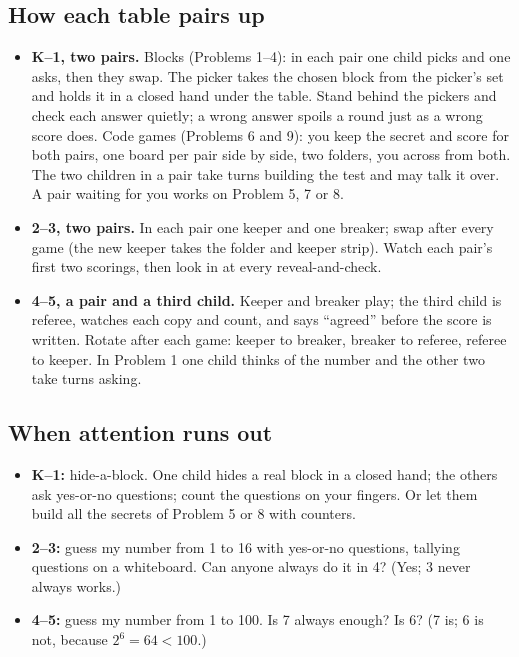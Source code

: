\documentclass[11pt]{article}
\begin{document}
\subsection{How each table pairs up}
\begin{itemize}
\item \textbf{K--1, two pairs.} Blocks (Problems 1--4): in each pair one child picks and one asks, then they swap. The picker takes the chosen block from the picker's set and holds it in a closed hand under the table. Stand behind the pickers and check each answer quietly; a wrong answer spoils a round just as a wrong score does. Code games (Problems 6 and 9): you keep the secret and score for both pairs, one board per pair side by side, two folders, you across from both. The two children in a pair take turns building the test and may talk it over. A pair waiting for you works on Problem 5, 7 or 8.
\item \textbf{2--3, two pairs.} In each pair one keeper and one breaker; swap after every game (the new keeper takes the folder and keeper strip). Watch each pair's first two scorings, then look in at every reveal-and-check.
\item \textbf{4--5, a pair and a third child.} Keeper and breaker play; the third child is referee, watches each copy and count, and says ``agreed'' before the score is written. Rotate after each game: keeper to breaker, breaker to referee, referee to keeper. In Problem 1 one child thinks of the number and the other two take turns asking.
\end{itemize}

\subsection{When attention runs out}
\begin{itemize}
\item \textbf{K--1:} hide-a-block. One child hides a real block in a closed hand; the others ask yes-or-no questions; count the questions on your fingers. Or let them build all the secrets of Problem 5 or 8 with counters.
\item \textbf{2--3:} guess my number from 1 to 16 with yes-or-no questions, tallying questions on a whiteboard. Can anyone always do it in 4? (Yes; 3 never always works.)
\item \textbf{4--5:} guess my number from 1 to 100. Is 7 always enough? Is 6? (7 is; 6 is not, because $2^6=64<100$.)
\end{itemize}
\end{document}
